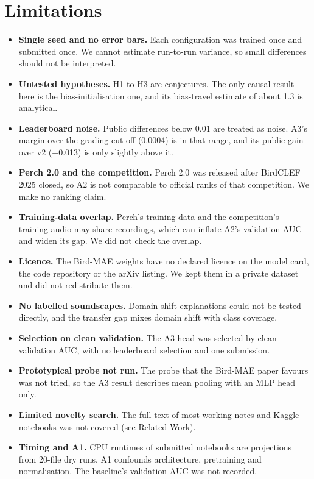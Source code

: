\documentclass[letterpaper]{article} %
\begin{document}
\section{Limitations}
\begin{itemize}
\item \textbf{Single seed and no error bars.} Each configuration was trained once and submitted once. We cannot estimate run-to-run variance, so small differences should not be interpreted.
\item \textbf{Untested hypotheses.} H1 to H3 are conjectures. The only causal result here is the bias-initialisation one, and its bias-travel estimate of about 1.3 is analytical.
\item \textbf{Leaderboard noise.} Public differences below 0.01 are treated as noise. A3's margin over the grading cut-off (0.0004) is in that range, and its public gain over v2 (+0.013) is only slightly above it.
\item \textbf{Perch 2.0 and the competition.} Perch 2.0 was released after BirdCLEF 2025 closed, so A2 is not comparable to official ranks of that competition. We make no ranking claim.
\item \textbf{Training-data overlap.} Perch's training data and the competition's training audio may share recordings, which can inflate A2's validation AUC and widen its gap. We did not check the overlap.
\item \textbf{Licence.} The Bird-MAE weights have no declared licence on the model card, the code repository or the arXiv listing. We kept them in a private dataset and did not redistribute them.
\item \textbf{No labelled soundscapes.} Domain-shift explanations could not be tested directly, and the transfer gap mixes domain shift with class coverage.
\item \textbf{Selection on clean validation.} The A3 head was selected by clean validation AUC, with no leaderboard selection and one submission.
\item \textbf{Prototypical probe not run.} The probe that the Bird-MAE paper favours was not tried, so the A3 result describes mean pooling with an MLP head only.
\item \textbf{Limited novelty search.} The full text of most working notes and Kaggle notebooks was not covered (see Related Work).
\item \textbf{Timing and A1.} CPU runtimes of submitted notebooks are projections from 20-file dry runs. A1 confounds architecture, pretraining and normalisation. The baseline's validation AUC was not recorded.
\end{itemize}
\end{document}

